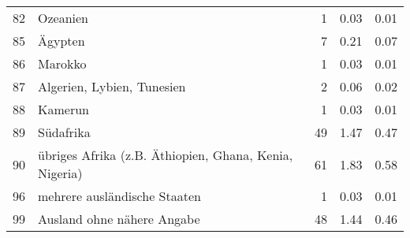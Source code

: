 \begin{longtable}{lXrrr}
        82 & \multicolumn{1}{X}{Ozeanien} & %
          \num{1} &
          \num[round-mode=places,round-precision=2]{0,03} &
          \num[round-mode=places,round-precision=2]{0,01} \\

        85 & \multicolumn{1}{X}{Ägypten} & %
          \num{7} &
          \num[round-mode=places,round-precision=2]{0,21} &
          \num[round-mode=places,round-precision=2]{0,07} \\

        86 & \multicolumn{1}{X}{Marokko} & %
          \num{1} &
          \num[round-mode=places,round-precision=2]{0,03} &
          \num[round-mode=places,round-precision=2]{0,01} \\

        87 & \multicolumn{1}{X}{Algerien, Lybien, Tunesien} & %
          \num{2} &
          \num[round-mode=places,round-precision=2]{0,06} &
          \num[round-mode=places,round-precision=2]{0,02} \\

        88 & \multicolumn{1}{X}{Kamerun} & %
          \num{1} &
          \num[round-mode=places,round-precision=2]{0,03} &
          \num[round-mode=places,round-precision=2]{0,01} \\

        89 & \multicolumn{1}{X}{Südafrika} & %
          \num{49} &
          \num[round-mode=places,round-precision=2]{1,47} &
          \num[round-mode=places,round-precision=2]{0,47} \\

        90 & \multicolumn{1}{X}{übriges Afrika (z.B. Äthiopien, Ghana, Kenia, Nigeria)} & %
          \num{61} &
          \num[round-mode=places,round-precision=2]{1,83} &
          \num[round-mode=places,round-precision=2]{0,58} \\

        96 & \multicolumn{1}{X}{mehrere ausländische Staaten} & %
          \num{1} &
          \num[round-mode=places,round-precision=2]{0,03} &
          \num[round-mode=places,round-precision=2]{0,01} \\

        99 & \multicolumn{1}{X}{Ausland ohne nähere Angabe} & %
          \num{48} &
          \num[round-mode=places,round-precision=2]{1,44} &
          \num[round-mode=places,round-precision=2]{0,46} \\


\end{longtable}
